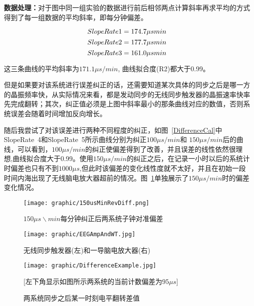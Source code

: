 \textbf{数据处理：}对于图中同一组实验的数据进行前后相邻两点计算斜率再求平均的方式得到了每一组数据的平均斜率，即每分钟偏差。

\begin{equation}
SlopeRate1 = 174.7 \mu s \\ min
\end{equation}
\begin{equation}
SlopeRate2 = 177.7 \mu s \\ min
\end{equation}
\begin{equation}
SlopeRate3 = 161.0 \mu s \\ min
\end{equation}

这三条曲线的平均斜率为$171.1 \mu s/min$, 曲线拟合度(R2)都大于0.99。

	但是如果要对该系统进行误差纠正的话，还需要知道某次具体的同步之后是哪一方的晶振频率快，从实际情况来看，都是发动同步的无线同步触发器的晶振速率快率先完成翻转；其次，纠正值必须是上图中斜率最小的那条曲线对应的数值，否则系统误差会随着时间增加反向增长。

随后我尝试了对该误差进行两种不同程度的纠正，如图~\ref{DifferenceCal}中SlopeRate~4和SlopeRate~5所示曲线分别为纠正$100 \mu s / min$和 $150 \mu s / min$后的曲线，可以看到，$100 \mu s / min$的纠正使偏差得到了改善，并且误差的线性依然很理想,曲线拟合度大于0.99。使用$150 \mu s / min$的纠正之后，在记录一小时以后的系统计时偏差也只有不到$ 1000 \mu s$,但此时该偏差的变化线性度就不太好，并且在初始一段时间内海出现了无线脑电放大器超前的情况。图~\ref{Diff150usMin}单独展示了$150 \mu s / min$时的偏差变化情况。

\begin{figure}[!hbp]
\begin{center}
\texttt{[image: graphic/150usMinRevDiff.png]}
\caption{$150\mu s \backslash min $每分钟纠正后两系统子钟对准偏差 \label{Diff150usMin}}
\end{center}
\end{figure}


\begin{figure}[!hbp]
\begin{center}
\texttt{[image: graphic/EEGAmpAndWT.jpg]}
\caption{无线同步触发器(左)和一导脑电放大器(右) \label{EEGAmpWirelessTrigger}}
\end{center}
\end{figure}

\begin{figure}[!hbp]
\begin{center}
\texttt{[image: graphic/DifferenceExample.jpg]}
\caption{ 两系统同步之后某一时刻电平翻转差值 \label{Difference1sExam1}}
[左下角显示如图所示两系统的当前计数偏差为$95 \mu s$]
\end{center}
\end{figure}

